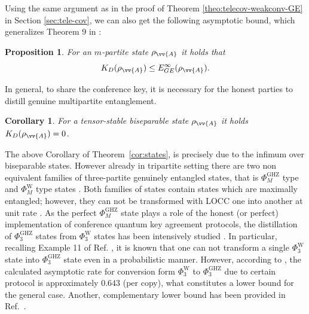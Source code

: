 \documentclass[aps,pra,twocolumn,superscriptaddress,longbibliography]{revtex4-1}
\newtheorem{corollary}{Corollary}
\newtheorem{proposition}{Proposition}
\begin{document}
Using the same argument as in the proof of Theorem \ref{theo:telecov-weakconv-GE} in Section \ref{sec:tele-cov}, we can also get the following asymptotic bound, which generalizes Theorem 9 in \cite{HHHO09}:
\begin{proposition}\label{bisep:theorem9}
For an $m$-partite state $\rho_{\vv{A}}$ it holds that
\begin{equation}
K_D(\rho_{\vv{A}})\leq E^\infty_{GE}(\rho_{\vv{A}}).
\end{equation}
\end{proposition}


In general, to share the conference key, it is necessary for the honest parties to distill genuine multipartite entanglement. 

\begin{corollary}
For a tensor-stable biseparable state $\rho_{\vv{A}}$ it holds $K_D(\rho_{\vv{A}})=0$.
\end{corollary}

The above Corollary of Theorem~\ref{cor:states}, is precisely due to the infimum over biseparable states. However already in tripartite setting there are two non equivalent families of three-partite genuinely entangled states, that is $\Phi_M^\mathrm{GHZ}$ type and $\Phi_M^\mathrm{W}$ type states \cite{nonEquivWandGHZ,bennett2000exact,HHHH09,amico2008entanglement,HSD15,spee2017entangled}. Both families of states contain states which are maximally entangled; however, they can not be transformed with LOCC one into another at unit rate \cite{FL-2007,FL-2008,Hoi-Kwong2010,vrana2015asymptotic,vrana2019distillation,streltsov2020rates}. As the perfect $\Phi_M^\mathrm{GHZ}$ state plays a role of the honest (or perfect) implementation of conference quantum key agreement protocols, the distillation of $\Phi_3^\mathrm{GHZ}$ states from $\Phi_3^\mathrm{W}$ states has been intensively studied \cite{SVW,FL-2007,KT-2010,CCL-2011,vrana2015asymptotic,vrana2019distillation}. In particular, recalling Example 11 of Ref. \cite{SVW}, it is known that one can not transform a single $\Phi_3^\mathrm{W}$ state into $\Phi_3^\mathrm{GHZ}$ state even in a probabilistic manner. However, according to \cite[Theorem~2]{SVW}, the calculated asymptotic rate for conversion form $\Phi_3^\mathrm{W}$ to $\Phi_3^\mathrm{GHZ}$ due to certain protocol is approximately $0.643$ (per copy), what constitutes a lower bound for the general case. Another, complementary lower bound has been provided in Ref.~\cite{vrana2019distillation}.
\end{document}
